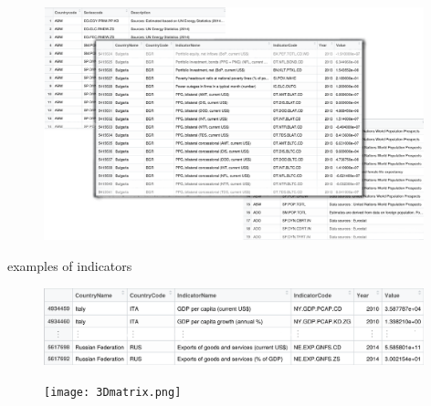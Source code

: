 \documentclass{beamer}
\begin{document}
\begin{frame}
	\begin{figure}
		\centering
		\includegraphics[width=11cm]{tables_2.png}
	\end{figure}
\end{frame}

\begin{frame}{examples of indicators}
	\begin{figure}
		\centering
		\includegraphics [width=11cm]{indicators.png}
		
	\end{figure}
\end{frame}

\begin{frame}{}
	\begin{figure}
		\centering
		\texttt{[image: 3Dmatrix.png]}
		
	\end{figure}
\end{frame}
\end{document}
